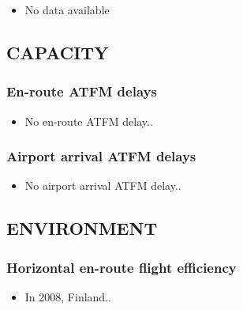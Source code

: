 \documentclass[]{book}
\providecommand{\tightlist}{%
  \setlength{\itemsep}{0pt}\setlength{\parskip}{0pt}}
\begin{document}
\begin{itemize}
\tightlist
\item
  No data available
\end{itemize}

\hypertarget{capacity}{%
\subsection*{CAPACITY}\label{capacity}}

\hypertarget{en-route-atfm-delays}{%
\subsubsection*{En-route ATFM delays}\label{en-route-atfm-delays}}

\begin{itemize}
\tightlist
\item
  No en-route ATFM delay..
\end{itemize}

\hypertarget{airport-arrival-atfm-delays}{%
\subsubsection*{Airport arrival ATFM delays}\label{airport-arrival-atfm-delays}}

\begin{itemize}
\tightlist
\item
  No airport arrival ATFM delay..
\end{itemize}

\hypertarget{environment}{%
\subsection*{ENVIRONMENT}\label{environment}}

\hypertarget{horizontal-en-route-flight-efficiency}{%
\subsubsection*{Horizontal en-route flight efficiency}\label{horizontal-en-route-flight-efficiency}}

\begin{itemize}
\tightlist
\item
  In 2008, Finland..
\end{itemize}
\end{document}
